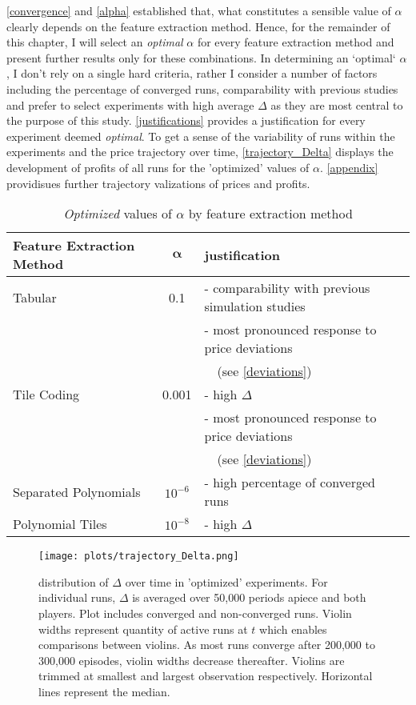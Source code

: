 \autoref{convergence} and \autoref{alpha} established that, what constitutes a sensible value of $\alpha$ clearly depends on the feature extraction method. Hence, for the remainder of this chapter, I will select an \emph{optimal} $\alpha$ for every feature extraction method and present further results only for these combinations. In determining an `optimal` $\alpha$, I don't rely on a single hard criteria, rather I consider a number of factors including the percentage of converged runs, comparability with previous studies and prefer to select experiments with high average $\Delta$ as they are most central to the purpose of this study. \autoref{justifications} provides a justification for every experiment deemed \emph{optimal}. To get a sense of the variability of runs within the experiments and the price trajectory over time, \autoref{trajectory_Delta} displays the development of profits of all runs for the 'optimized' values of $\alpha$. \autoref{appendix} providisues further trajectory valizations of prices and profits.

\begin{center}
	\begin{table}
		
		\begin{tabular}{|l|c|l|}
			\hline
			\textbf{Feature Extraction Method}&$\boldsymbol{\alpha}$&\textbf{justification} \\
			\hline
			Tabular&0.1&- comparability with previous simulation studies \\
			&&- most pronounced response to price deviations \\
			&& \ \ (see \autoref{deviations}) \\
			\hline
			Tile Coding&0.001&- high $\Delta$ \\
			&&- most pronounced response to price deviations \\
			&&\ \ (see \autoref{deviations}) \\
			\hline
			Separated Polynomials&$10^{-6}$&- high percentage of converged runs \\
			\hline
			Polynomial Tiles&$10^{-8}$&- high $\Delta$ \\
			\hline
		\end{tabular}
		\caption{\emph{Optimized} values of $\alpha$ by feature extraction method}
		\label{justifications}
	\end{table}
\end{center}


\begin{figure}
	\texttt{[image: plots/trajectory\_Delta.png]}
	\caption{distribution of $\Delta$ over time in 'optimized' experiments. For individual runs, $\Delta$ is averaged over 50,000 periods apiece and both players. Plot includes converged and non-converged runs. Violin widths represent quantity of active runs at $t$ which enables comparisons between violins. As most runs converge after 200,000 to 300,000 episodes, violin widths decrease thereafter. Violins are trimmed at smallest and largest observation respectively. Horizontal lines represent the median.}
	\label{trajectory_Delta}
\end{figure}

